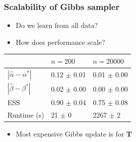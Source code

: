 \documentclass[final,hyperref={pdfpagelabels=false},noamsthm]{beamer}
\newcommand{\bfT}{\mathbf{T}}
\begin{document}
\begin{frame}
	\frametitle{Scalability of Gibbs sampler}
	\begin{itemize}
		\item Do we learn from all data?
		\item How does performance scale?
	\end{itemize}
	\pause
	
	\begin{table}[t]
		\label{tab:ess:scale:n}
		\vspace*{-0.25\baselineskip}
		\begin{center}
			\begin{tabular}{l  ll}
				& $n=200$ &  $n=20000$ \\ 
				\hline
				$|\hat{\alpha} - \alpha^*|$ & 0.12 $\pm$ 0.01 &  0.01 $\pm$ 0.00 \\ 
				
				$|\hat{\beta} - \beta^*|$ &  0.02 $\pm$ 0.00  &    0.00 $\pm$ 0.00  \\ 
				
				ESS &  0.90 $\pm$ 0.04  &   0.75 $\pm$ 0.08  \\  
				
				Runtime (s) &  21 $\pm$ 0   &  2267 $\pm$ 2  \\ 
				
			\end{tabular}
		\end{center}
	\end{table}
	\begin{itemize}
		\item Most expensive Gibbs update is for $\bfT$
	\end{itemize}
\end{frame}
\end{document}
